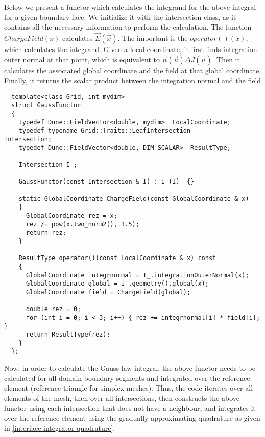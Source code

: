 \noindent
Below we present a functor which calculates the integrand for the above integral for a given boundary face. We initialize it with the intersection class, as it contains all the necessary information to perform the calculation. The function $ChargeField(x)$ calculates $\vec{E}(\vec{x})$. The important is the $operator()(x)$, which calculates the integrand. Given a local coordinate, it first finds integration outer normal at that point, which is equivalent to $\vec{n}(\vec{u}) \Delta J(\vec{u})$. Then it calculates the associated global coordinate and the field at that global coordinate. Finally, it returns the scalar product between the integration normal and the field \\


\begin{mybox}
\begin{lstlisting}
  template<class Grid, int mydim>
  struct GaussFunctor
  {
    typedef Dune::FieldVector<double, mydim>  LocalCoordinate;
    typedef typename Grid::Traits::LeafIntersection               Intersection;
    typedef Dune::FieldVector<double, DIM_SCALAR>  ResultType;

    Intersection I_;

    GaussFunctor(const Intersection & I) : I_(I)  {}

    static GlobalCoordinate ChargeField(const GlobalCoordinate & x)
    {
      GlobalCoordinate rez = x;
      rez /= pow(x.two_norm2(), 1.5);
      return rez;
    }

    ResultType operator()(const LocalCoordinate & x) const
    {
      GlobalCoordinate integrnormal = I_.integrationOuterNormal(x);
      GlobalCoordinate global = I_.geometry().global(x);
      GlobalCoordinate field = ChargeField(global);

      double rez = 0;
      for (int i = 0; i < 3; i++) { rez += integrnormal[i] * field[i]; }
      return ResultType(rez);
    }
  };
\end{lstlisting}
\end{mybox}

\noindent
Now, in order to calculate the Gauss law integral, the above functor needs to be calculated for all domain boundary segments and integrated over the reference element (reference triangle for simplex meshes). Thus, the code iterates over all elements of the mesh, then over all intersections, then constructs the above functor using each intersection that does not have a neighbour, and integrates it over the reference element using the gradually approximating quadrature as given in \ref{interface-integrator-quadrature}. \\

